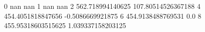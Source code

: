 0 nan nan
1 nan nan
2 562.718994140625 107.80514526367188
4 454.4051818847656 -0.5086669921875
6 454.9138488769531 0.0
8 455.95318603515625 1.039337158203125

